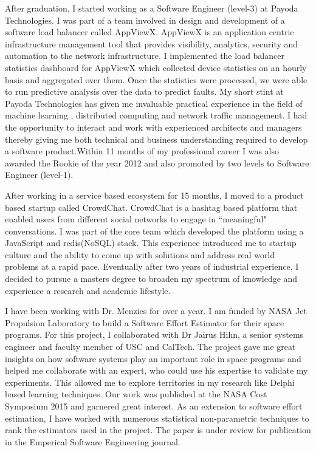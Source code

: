 \documentclass{article}
\begin{document}
\bigskip

After graduation, I started working as a Software Engineer (level-3) at Payoda Technologies. I was part of a team involved in design and development of a software load balancer called AppViewX. AppViewX is an application centric infrastructure management tool that provides visibility, analytics, security and automation to the network infrastructure. I implemented the load balancer statistics dashboard for AppViewX which collected device statistics on an hourly basis and aggregated over them. Once the statistics were processed, we were able to run predictive analysis over the data to predict faults. My short stint at Payoda Technologies has given me invaluable practical experience in the field of machine learning , 
distributed computing and network traffic management. I had the opportunity to interact and 
work with experienced architects and managers thereby giving me both technical and business
understanding required to develop a software product.Within 11 months of my professional career I was also awarded the Rookie of the year 2012 and also promoted by two levels to Software Engineer (level-1). 

\bigskip
After working in a service based ecosystem for 15 months, I moved to a product based startup called CrowdChat. CrowdChat is a hashtag based platform that enabled users from different social networks to engage in ``meaningful" conversations. I was part of the  core team which developed the platform using a JavaScript and redis(NoSQL) stack. This experience introduced me to startup culture and the ability to come up with solutions and address real world problems at a rapid pace. Eventually after two years of industrial experience, I decided to pursue a masters degree to broaden my spectrum of knowledge and experience a research and academic lifestyle.


\bigskip
I have been working with Dr. Menzies for over a year. I am funded by NASA Jet Propulsion Laboratory to build a Software Effort Estimator for their space programs. For this project, I collaborated with Dr Jairus Hihn, a senior systems engineer and faculty member of USC and CalTech. The project gave me great insights on how software systems play an important role in space programs and helped me collaborate with an expert, who could use his expertise to validate my experiments. This allowed me to explore territories in my research like Delphi based learning techniques. Our work was published at the NASA Cost Symposium 2015 and garnered great interest. As an extension to software effort estimation, I have worked with numerous statistical non-parametric techniques to rank the estimators used in the project. The paper is under review for publication in the Emperical Software Engineering journal.
\end{document}
